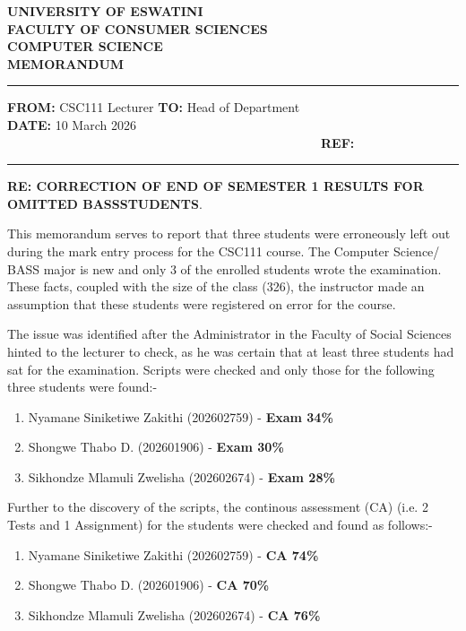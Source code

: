\documentclass[12pt]{letter}
\begin{document}
\begin{center}
\textbf{UNIVERSITY OF ESWATINI} \\[4pt]
\textbf{FACULTY OF CONSUMER SCIENCES} \\[4pt]
\textbf{COMPUTER SCIENCE} \\[10pt]
\textbf{MEMORANDUM}
\end{center}

\vspace{0.5cm}

\noindent\rule{\textwidth}{0.4pt}

\textbf{FROM:} CSC111 Lecturer \hfill   \textbf{TO:} Head of Department \\

\textbf{DATE:} 10 March 2026 \ \ \ \ \ \ \ \ \ \ \ \ \ \ \ \ \ \ \ \ \ \ \ \ \ \ \ \ \ \ \ \ \ \ \ \ \ \ \ \ \ \ \ \ \ \ \ \ \ \   \textbf{REF:} 

\noindent\rule{\textwidth}{0.4pt}

\textbf{RE: CORRECTION OF END OF SEMESTER 1 RESULTS FOR OMITTED BASSSTUDENTS}.



\vspace{0.5cm}

This memorandum serves to report that three students were erroneously left out during the mark entry process for the CSC111 course. The Computer Science/ BASS major is new and only 3 of the enrolled students wrote the examination. These facts, coupled with the size of the class (326), the instructor made an assumption that these students were registered on error for the course.

The issue was identified after the Administrator in the Faculty of Social Sciences hinted to the lecturer to check, as he was certain that at least three students had sat for the examination. Scripts were checked and only those for the following three students  were found:-
\begin{enumerate}
    \item Nyamane Siniketiwe Zakithi (202602759) - \textbf{Exam 34\%   }
    \item Shongwe Thabo D. (202601906) - \textbf{Exam 30\%}   
    \item Sikhondze Mlamuli Zwelisha (202602674) - \textbf{Exam 28\%   }
\end{enumerate} 

Further to the discovery of the scripts, the continous assessment (CA) (i.e. 2 Tests and 1 Assignment) for the students were checked and found as follows:-
\begin{enumerate}
    \item Nyamane Siniketiwe Zakithi (202602759) - \textbf{CA 74\%   }
    \item Shongwe Thabo D. (202601906) - \textbf{CA 70\%}   
    \item Sikhondze Mlamuli Zwelisha (202602674) - \textbf{CA 76\%   }
\end{enumerate}
\end{document}
